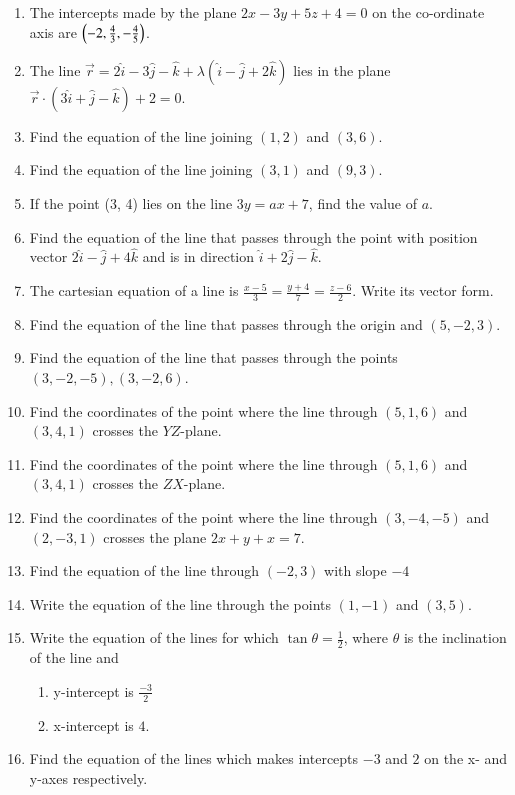 \begin{enumerate}[label=\thesubsection.\arabic*, ref=\thesubsection.\theenumi]
\begin{enumerate}
\end{enumerate}
\item The intercepts made by the plane $2x-3y+5z+4=0$ on the co-ordinate axis are $\left(-2, \frac{4}{3}, -\frac{4}{5}\right)$.
\item The line $\overrightarrow{r}=2\hat{i}-3\hat{j}-\hat{k}+\lambda(\hat{i}-\hat{j}+2\hat{k})$ lies in the plane $\overrightarrow{r} \cdot (3\hat{i}+\hat{j}-\hat{k})+2=0$.
\item Find the equation of the line joining $(1, 2)$ and $(3, 6)$.
\item Find the equation of the line joining $(3, 1)$ and $(9, 3)$.
\item If the point (3,  4) lies on the line $3y=ax+7$,  find the value of $a$.
\item  Find the equation of the line that passes through the point with position vector $2\hat{i}-\hat{j}+4\hat{k}$ and is in direction $\hat{i}+2\hat{j}-\hat{k}$.
\item The cartesian equation of a line is $ \frac{x-5}{3}=\frac{y+4}{7}=\frac{z-6}{2}$. Write its vector form.
\item Find the equation of the line that passes through the origin and $(5, -2, 3)$.
\item Find the equation of the line that passes through the points $(3, -2, -5), (3, -2, 6)$.
\item Find the coordinates of the point where the line through $(5,1,6)$ and $(3,4,1)$ crosses the $YZ$-plane.
\item Find the coordinates of the point where the line through $(5,1,6)$ and $(3,4,1)$ crosses the $ZX$-plane.
\item Find the coordinates of the point where the line through $(3,-4,-5)$ and $(2,-3,1)$ crosses the plane $2x+y+x=7$.
\item Find the equation of the line through $(-2,3)$ with slope $-4$
\item Write the equation of the line through the points $(1,-1)$ and $(3,5)$.
\item Write the equation of the lines for which $\tan \theta=\frac{1}{2}$, where $\theta$ is the inclination of the line and
\begin{enumerate}
\item  y-intercept is $\frac{-3}{2}$ 
\item  x-intercept is $4$.
\end{enumerate}
\item Find the equation of the lines which makes intercepts $-3$ and $2$ on the x- and y-axes respectively.

\end{enumerate}
